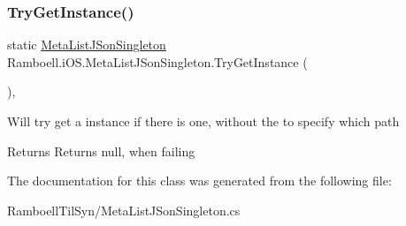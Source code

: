 \subsubsection{\texorpdfstring{Try\+Get\+Instance()}{TryGetInstance()}}
{\footnotesize\ttfamily static \hyperlink{class_ramboell_1_1i_o_s_1_1_meta_list_j_son_singleton}{Meta\+List\+J\+Son\+Singleton} Ramboell.\+i\+O\+S.\+Meta\+List\+J\+Son\+Singleton.\+Try\+Get\+Instance (\begin{DoxyParamCaption}{ }\end{DoxyParamCaption})\hspace{0.3cm}{\ttfamily [inline]}, {\ttfamily [static]}}



Will try get a instance if there is one, without the to specify which path 

\begin{DoxyReturn}{Returns}
Returns null, when failing
\end{DoxyReturn}


The documentation for this class was generated from the following file\+:\begin{DoxyCompactItemize}
\item 
Ramboell\+Til\+Syn/Meta\+List\+J\+Son\+Singleton.\+cs\end{DoxyCompactItemize}
